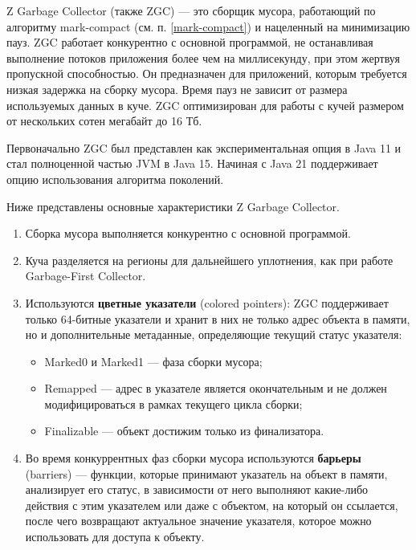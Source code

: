 Z Garbage Collector (также ZGC) --- это сборщик мусора, работающий по алгоритму mark-compact (см. п. \ref{mark-compact}) и нацеленный на минимизацию пауз. ZGC работает конкурентно с основной программой, не останавливая выполнение потоков приложения более чем на миллисекунду, при этом жертвуя пропускной способностью. Он предназначен для приложений, которым требуется низкая задержка на сборку мусора. Время пауз не зависит от размера используемых данных в куче. ZGC оптимизирован для работы с кучей размером от нескольких сотен мегабайт до 16 Тб. \cite{java_zgc}

Первоначально ZGC был представлен как экспериментальная опция в Java 11 и стал полноценной частью JVM в Java 15. \cite{java_zgc} Начиная с Java 21 поддерживает опцию использования алгоритма поколений. \cite{java_21_available_collectors}

Ниже представлены основные характеристики Z Garbage Collector. \cite{java_zgc}

\begin{enumerate}[label*=\arabic*.]
	\item Сборка мусора выполняется конкурентно с основной программой.
	
	\item Куча разделяется на регионы для дальнейшего уплотнения, как при работе Garbage-First Collector.
	
	\item Используются \textbf{цветные указатели} (colored pointers): ZGC поддерживает только 64-битные указатели и хранит в них не только адрес объекта в памяти, но и дополнительные метаданные, определяющие текущий статус указателя:
	\begin{itemize}[label*=---]
		\item Marked0 и Marked1 --- фаза сборки мусора;
		\item Remapped --- адрес в указателе является окончательным и не должен модифицироваться в рамках текущего цикла сборки;
		\item Finalizable --- объект достижим только из финализатора.
	\end{itemize}

	\item Во время конкуррентных фаз сборки мусора используются \textbf{барьеры} (barriers) --- функции, которые принимают указатель на объект в памяти, анализирует его статус, в зависимости от него выполняют какие-либо действия с этим указателем или даже с объектом, на который он ссылается, после чего возвращают актуальное значение указателя, которое можно использовать для доступа к объекту.
\end{enumerate}

